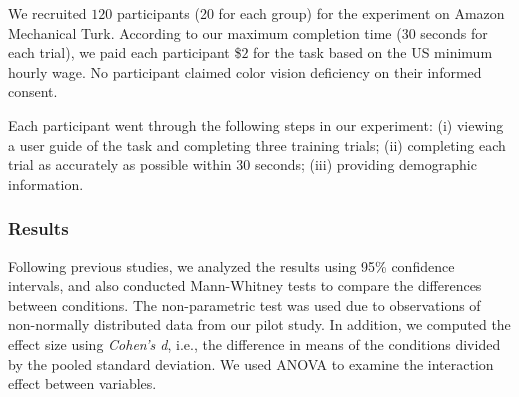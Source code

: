 \vspace{.3em}
We recruited $120$ participants (20 for each group) for the experiment on Amazon Mechanical Turk.
According to our maximum completion time ($30$ seconds for each trial), we paid each participant \$$2$ for the task based on the US minimum hourly wage.
No participant claimed color vision deficiency on their informed consent.

\vspace{.3em}
Each participant went through the following steps in our experiment: (i) viewing a user guide of the task and completing three training trials; (ii) completing each trial as accurately as possible within $30$ seconds; (iii) providing demographic information.

\subsubsection{Results}

Following previous studies, we analyzed the results using 95\% confidence intervals, and also conducted Mann-Whitney tests to compare the differences between conditions. The non-parametric test was used due to observations of non-normally distributed data from our pilot study. In addition, we computed the effect size using \emph{Cohen's d}, i.e., the difference in means of the conditions divided by the pooled standard deviation. We used ANOVA to examine the interaction effect between variables.

